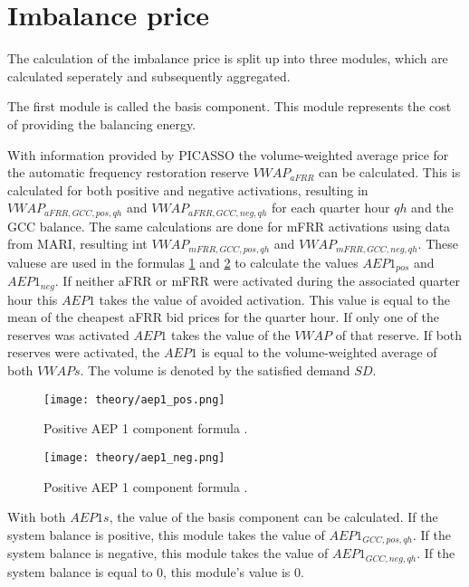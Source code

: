 \documentclass[class=scrbook, crop=false]{standalone}
\begin{document}
\section{Imbalance price}
\label{chapter::Imbalance_Price}
The calculation of the imbalance price is split up into three modules, which are calculated seperately and subsequently aggregated.

The first module is called the basis component. 
This module represents the cost of providing the balancing energy.

With information provided by PICASSO the volume-weighted average price for the automatic frequency restoration reserve $VWAP_{aFRR}$ can be calculated. This is calculated for both positive and negative activations, resulting in $VWAP_{aFRR, GCC, pos, qh}$ and $VWAP_{aFRR,  GCC, neg, qh}$ for each quarter hour $qh$ and the GCC balance.
The same calculations are done for mFRR activations using data from MARI, resulting int $VWAP_{mFRR, GCC, pos, qh}$ and $VWAP_{mFRR, GCC, neg, qh}$. 
These valuese are used in the formulas \ref{fig::aep1_pos} and \ref{fig::aep1_neg} to calculate the values $AEP1_{pos}$ and $AEP1_{neg}$. 
If neither aFRR or mFRR were activated during the associated quarter hour this $AEP1$ takes the value of avoided activation. This value is equal to the mean of the cheapest aFRR bid prices for the quarter hour.
If only one of the reserves was activated $AEP1$ takes the value of the $VWAP$ of that reserve. 
If both reserves were activated, the $AEP1$ is equal to the volume-weighted average of both $VWAPs$. The volume is denoted by the satisfied demand $SD$.

\begin{figure}[ht]
            \centering
            \texttt{[image: theory/aep1\_pos.png]}
            \caption[Positive AEP 1 component formula]{Positive AEP 1 component formula \cite{reBAP}.}
            \label{fig::aep1_pos}
 \end{figure}
 
 \begin{figure}[ht]
            \centering
            \texttt{[image: theory/aep1\_neg.png]}
             \caption[Positive AEP 1 component formula]{Positive AEP 1 component formula \cite{reBAP}.}
            \label{fig::aep1_neg}
 \end{figure}

With both $AEP1s$, the value of the basis component can be calculated. If the system balance is positive, this module takes the value of $AEP1_{GCC, pos, qh}$. If the system balance is negative, this module takes the value of $AEP1_{GCC, neg, qh}$. If the system balance is equal to 0, this module's value is 0.
\end{document}
